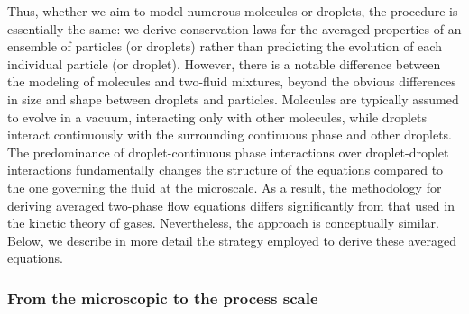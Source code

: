 Thus, whether we aim to model numerous molecules or droplets, the procedure is essentially the same: we derive conservation laws for the averaged properties of an ensemble of particles (or droplets) rather than predicting the evolution of each individual particle (or droplet).
However, there is a notable difference between the modeling of molecules and two-fluid mixtures, beyond the obvious differences in size and shape between droplets and particles.
Molecules are typically assumed to evolve in a vacuum, interacting only with other molecules, while droplets interact continuously with the surrounding continuous phase and other droplets.
The predominance of droplet-continuous phase interactions over droplet-droplet interactions fundamentally changes the structure of the equations compared to the one governing the fluid at the microscale.
As a result, the methodology for deriving averaged two-phase flow equations differs significantly from that used in the kinetic theory of gases.
Nevertheless, the approach is conceptually similar.
Below, we describe in more detail the strategy employed to derive these averaged equations. 


\subsubsection{From the microscopic to the process scale}

